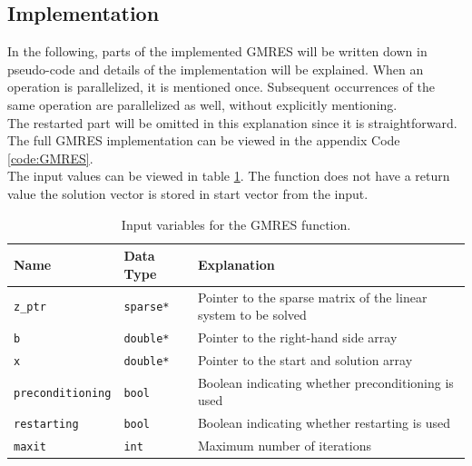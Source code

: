 \documentclass{article}
\begin{document}
\subsection{Implementation}
In the following, parts of the implemented GMRES will be written down in pseudo-code and details of the implementation will be explained. When an operation is parallelized, it is mentioned once. Subsequent occurrences of the same operation are parallelized as well, without explicitly mentioning.\\
The restarted part will be omitted in this explanation since it is straightforward.\\
The full GMRES implementation can be viewed in the appendix Code \ref{code:GMRES}.\\
The input values can be viewed in table \ref{tab:gmres-input}. The function does not have a return value the solution vector is stored in start vector from the input. \\


\begin{table}[h]
\centering
\renewcommand{\arraystretch}{1.5}
\begin{tabular}{|p{3cm}|p{3cm}|p{10cm}|}
\hline
\rowcolor{gray!20}
\textbf{Name} & \textbf{Data Type} & \textbf{Explanation} \\
\hline
\lstinline|z_ptr| & \lstinline|sparse*| & Pointer to the sparse matrix of the linear system to be solved \\
\hline
\lstinline|b| & \lstinline|double*| & Pointer to the right-hand side array \\
\hline
\lstinline|x| & \lstinline|double*| & Pointer to the start and solution array \\
\hline
\lstinline|preconditioning| & \lstinline|bool| & Boolean indicating whether preconditioning is used \\
\hline
\lstinline|restarting| & \lstinline|bool| & Boolean indicating whether restarting is used \\
\hline
\lstinline|maxit| & \lstinline|int| & Maximum number of iterations \\
\hline
\end{tabular}

\caption{Input variables for the GMRES function.}
\label{tab:gmres-input}
\end{table}
\end{document}
